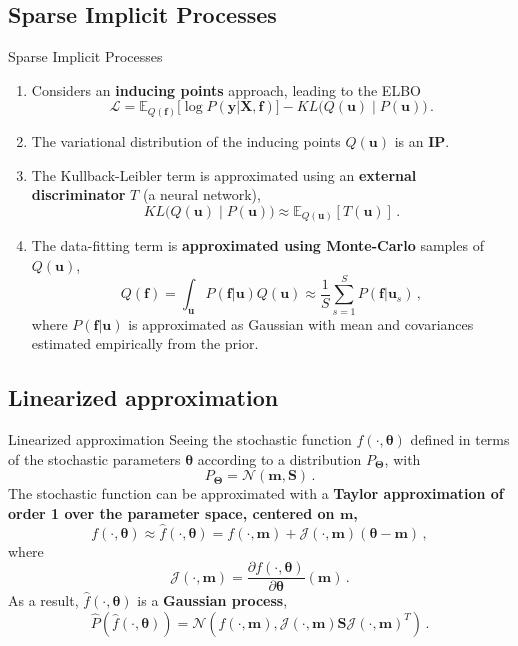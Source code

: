     \subsection{Sparse Implicit Processes}
    \begin{frame}{Sparse Implicit Processes}
        \begin{enumerate}
            \item Considers an \textbf{inducing points} approach, leading to the ELBO
                \[
                    \mathcal{L} = \mathbb{E}_{Q(\mathbf{f})}\Big[ \log P(\mathbf y | \mathbf X, \mathbf{f}) \Big] - KL\Big(Q(\bm u) \mid P(\bm u) \Big)\,.
                \]
            \item The variational distribution of the inducing points \(Q(\bm u)\) is an \textbf{IP}.
            \item The Kullback-Leibler term is approximated using an \textbf{external discriminator} \(T\) (a neural network),
            \[ 
             KL\Big(Q(\bm u) \mid P(\bm u) \Big) \approx \mathbb{E}_{Q(\bm u)}[T(\bm u)]\,.
            \]
            \item The data-fitting term is \textbf{approximated using Monte-Carlo} samples of \(Q(\bm u)\),
            \[
                Q(\mathbf f) = \int_{\bm u}P(\mathbf f |\bm u)Q(\bm u) \approx \frac{1}{S} \sum_{s=1}^S P(\mathbf f | \bm u_s)\,,
            \]
            where \(P(\mathbf f | \bm u)\) is approximated as Gaussian with mean and covariances estimated empirically from the prior.
        \end{enumerate}
        
    \end{frame}

    \subsection{Linearized approximation}
    \begin{frame}{Linearized approximation}
        Seeing the stochastic function \(f(\cdot, \bm \theta)\) defined in terms of the stochastic parameters \(\bm \theta\) according to a distribution \(P_{\bm \Theta}\), with 
        \[
        P_{\bm \Theta} = \mathcal{N}(\bm m, \bm S)\,.
        \]
        The stochastic function can be approximated with a \textbf{Taylor approximation of order 1 over the parameter space, centered on \(\bm m\),}
        \[
            f(\cdot, \bm \theta) \approx \hat{f}(\cdot, \bm \theta) = f(\cdot, \bm m) + \mathcal{J}(\cdot, \bm m)(\bm \theta - \bm m)\,,
        \]
        where 
        \[
            \mathcal{J}(\cdot, \bm m) = \frac{\partial f(\cdot, \bm \theta)}{\partial \bm \theta}(\bm m)\,.
        \]
        As a result, \(\hat{f}(\cdot, \bm \theta)\) is a \textbf{\alert{Gaussian process}},
        \[
             \hat{P}(\hat{f}(\cdot, \bm \theta)) = \mathcal{N}(f(\cdot, \bm m), \mathcal{J}(\cdot, \bm m) \bm S \mathcal{J}(\cdot, \bm m)^T)\,.
        \]    
    \end{frame}

